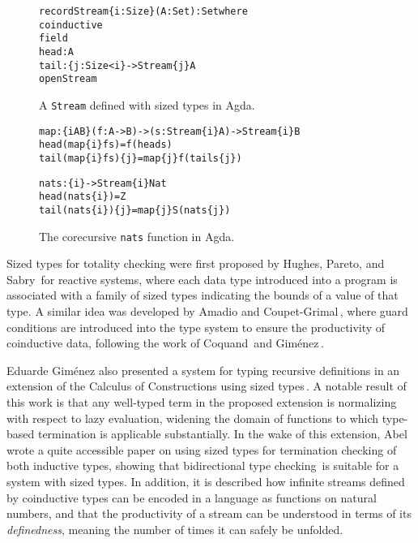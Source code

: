 \begin{figure}
\begin{alltt}
record Stream \{i : Size\} (A : Set) : Set where
  coinductive
  field
    head : A
    tail : \{j : Size< i\} ->  Stream \{j\} A
open Stream
\end{alltt}
\caption{A \texttt{Stream} defined with sized types in Agda.}
\label{fig:agda_stream_sized_types}
\end{figure}

\begin{figure}
\begin{alltt}
map : \{i A B\} (f : A -> B) -> (s : Stream \{i\} A) -> Stream \{i\} B
head (map \{i\} f s)     = f (head s)
tail (map \{i\} f s) \{j\} = map \{j\} f (tail s \{j\})

nats : \{i\} -> Stream \{i\} Nat
head (nats \{i\})     = Z
tail (nats \{i\}) \{j\} = map \{j\} S (nats \{j\})
\end{alltt}
\caption{The corecursive \texttt{nats} function in Agda.}
\label{fig:agda_nats_sized_types}
\end{figure}

Sized types for totality checking were first proposed by Hughes, Pareto, and Sabry\,\citep{Hughes96} for reactive systems, where each data type introduced into a program is associated with a family of sized types indicating the bounds of a value of that type. A similar idea was developed by Amadio and Coupet-Grimal\,\citep{Amadio98}, where guard conditions are introduced into the type system to ensure the productivity of coinductive data, following the work of Coquand\,\citep{Coquand94} and Gim\'{e}nez\,\citep{Gimenez95}.

Eduarde Gim\'{e}nez also presented a system for typing recursive definitions in an extension of the Calculus of Constructions using sized types\,\citep{Gimenez98structuralrecursive}. A notable result of this work is that any well-typed term in the proposed extension is normalizing with respect to lazy evaluation, widening the domain of functions to which type-based termination is applicable substantially. In the wake of this extension, Abel\,\citep{Abel99terminationchecking} wrote a quite accessible paper on using sized types for termination checking of both inductive types, showing that bidirectional type checking\,\citep{Pierce00} is suitable for a system with sized types. In addition, it is described how infinite streams defined by coinductive types can be encoded in a language as functions on natural numbers, and that the productivity of a stream can be understood in terms of its \emph{definedness}, meaning the number of times it can safely be unfolded.

